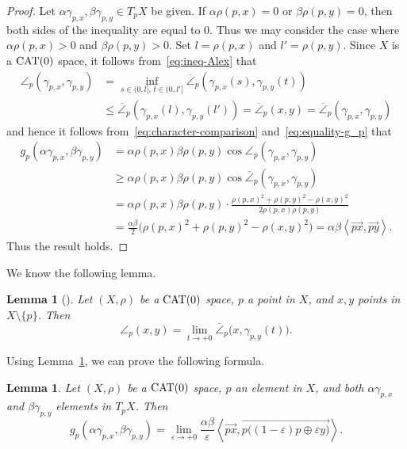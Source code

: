 \documentclass[draft]{amsart}
\numberwithin{equation}{section}
\newcommand{\ip}[2]{\left\langle #1, #2 \right\rangle}
\newcommand{\CAT}{\textup{CAT}}
\theoremstyle{plain}
\newtheorem{lemma}[theorem]{Lemma}
\theoremstyle{definition}
\theoremstyle{remark}
\begin{document}
\begin{proof}
 Let $\alpha \gamma_{p, x}, \beta \gamma_{p, y} \in T_pX$ be given. 
 If $\alpha \rho(p, x) = 0$ or $\beta \rho(p, y)=0$, 
 then both sides of the inequality are equal to $0$. 
 Thus we may consider the case where 
 $\alpha \rho(p, x) > 0$ and $\beta \rho(p, y)>0$. 
 Set $l=\rho(p, x)$ and $l'=\rho(p, y)$.  
 Since $X$ is a $\CAT(0)$ space, 
 it follows from~\eqref{eq:ineq-Alex} that 
 \begin{align*}
  \angle_p(\gamma_{p, x}, \gamma_{p, y}) 
 &= \inf_{s\in (0,l], \, t\in (0,l']} 
 \overline{\angle}_p(\gamma_{p, x}(s), \gamma_{p, y}(t)) \\
 &\leq
 \overline{\angle}_p(\gamma_{p, x}(l), \gamma_{p, y}(l')) 
 = \overline{\angle}_p(x, y) = \overline{\angle}_p(\gamma_{p, x}, \gamma_{p, y})  
 \end{align*}
 and hence it follows from~\eqref{eq:character-comparison} 
 and~\eqref{eq:equality-g_p} that 
 \begin{align*}
  g_p(\alpha \gamma_{p, x}, \beta \gamma_{p, y}) 
  &= \alpha \rho(p, x) \beta \rho (p, y) \cos \angle_p(\gamma_{p, x}, \gamma_{p, y}) \\
  &\geq \alpha \rho(p, x) \beta \rho (p, y) 
  \cos \overline{\angle}_p(\gamma_{p, x}, \gamma_{p, y}) \\
  &= \alpha \rho(p, x) \beta \rho (p, y) 
  \cdot \frac{\rho(p, x)^2 + \rho(p, y)^2 - \rho(x, y)^2}{2\rho(p, x)\rho(p, y)} \\
  &= \frac{\alpha \beta}{2}
  \bigl(\rho(p, x)^2 + \rho(p, y)^2 - \rho(x, y)^2\bigr)
 =\alpha \beta \ip{\overrightarrow{px}}{\overrightarrow{py}}. 
 \end{align*}
 Thus the result holds. 
\end{proof}

We know the following lemma. 

\begin{lemma}[\cite{MR1744486}]\label{lem:FVF}
 Let $(X, \rho)$ be a $\CAT(0)$ space, 
 $p$ a point in $X$, 
 and $x,y$ points in $X\setminus \{p\}$. 
 Then 
 \[
  \angle_{p}(x,y) 
 = \lim_{t\to +0} \overline{\angle}_p\bigl(x, \gamma_{p, y}(t)\bigr). 
 \]
\end{lemma}

Using Lemma~\ref{lem:FVF}, we can prove the following formula. 

\begin{lemma}\label{lem:relation-g_p-ip}
  Let $(X, \rho)$ be a $\CAT(0)$ space, 
 $p$ an element in $X$, and 
 both $\alpha \gamma_{p, x}$ and $\beta \gamma_{p, y}$ 
 elements in $T_pX$. 
 Then 
 \[
 g_p(\alpha \gamma_{p, x}, \beta \gamma_{p, y})
 = \lim_{\varepsilon \to +0} 
 \frac{\alpha \beta}{\varepsilon}
 \ip{\overrightarrow{px}}{\overrightarrow{p \bigl((1-\varepsilon)p\oplus \varepsilon y \bigr)}}. 
 \]
\end{lemma}
\end{document}
